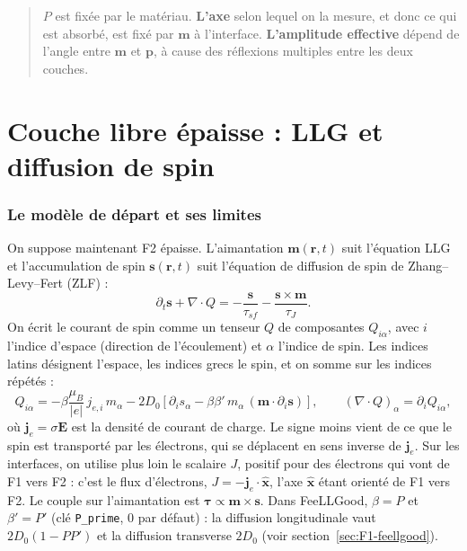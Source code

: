 \documentclass[11pt,a4paper]{article}
\newcommand{\vm}{\bm{m}}
\newcommand{\vp}{\bm{p}}
\newcommand{\vs}{\bm{s}}
\begin{document}
\begin{quote}
  $P$ est fixée par le matériau. \textbf{L'axe} selon lequel on la mesure,
  et donc ce qui est absorbé, est fixé par $\vm$ à l'interface.
  \textbf{L'amplitude effective} dépend de l'angle entre $\vm$ et $\vp$, à
  cause des réflexions multiples entre les deux couches.
\end{quote}

\part{Couche libre épaisse : LLG et diffusion de spin}

\section{Le modèle de départ et ses limites}

On suppose maintenant F2 épaisse. L'aimantation $\vm(\bm{r},t)$ suit
l'équation LLG et l'accumulation de spin $\vs(\bm{r},t)$ suit l'équation
de diffusion de spin de Zhang--Levy--Fert (ZLF) :
\begin{equation}
  \partial_t \vs + \nabla\cdot Q
  = -\frac{\vs}{\tau_{sf}} - \frac{\vs\times\vm}{\tau_J}.
  \label{eq:zlf}
\end{equation}
On écrit le courant de spin comme un tenseur $Q$ de composantes
$Q_{i\alpha}$, avec $i$ l'indice d'espace (direction de l'écoulement) et
$\alpha$ l'indice de spin. Les indices latins désignent l'espace, les
indices grecs le spin, et on somme sur les indices répétés :
\begin{equation}
  Q_{i\alpha} = -\beta\frac{\mu_B}{|e|}\,j_{e,i}\,m_\alpha
  - 2D_0\left[\partial_i s_\alpha - \beta\beta'\,m_\alpha\,(\vm\cdot\partial_i\vs)\right],
  \qquad (\nabla\cdot Q)_\alpha = \partial_i Q_{i\alpha},
  \label{eq:courant}
\end{equation}
où $\bm{j}_e = \sigma\bm{E}$ est la densité de courant de charge. Le signe
moins vient de ce que le spin est transporté par les électrons, qui se
déplacent en sens inverse de $\bm{j}_e$. Sur les interfaces, on utilise plus
loin le scalaire $J$, positif pour des électrons qui vont de F1 vers F2 :
c'est le flux d'électrons, $J = -\bm{j}_e\cdot\hat{\bm{x}}$, l'axe
$\hat{\bm{x}}$ étant orienté de F1 vers F2. Le couple sur l'aimantation est $\bm{\tau}\propto\vm\times\vs$. Dans
FeeLLGood, $\beta=P$ et $\beta'=P'$ (clé \texttt{P\_prime}, 0 par défaut) :
la diffusion longitudinale vaut $2D_0(1-PP')$ et la diffusion transverse
$2D_0$ (voir section~\ref{sec:F1-feellgood}).
\end{document}

